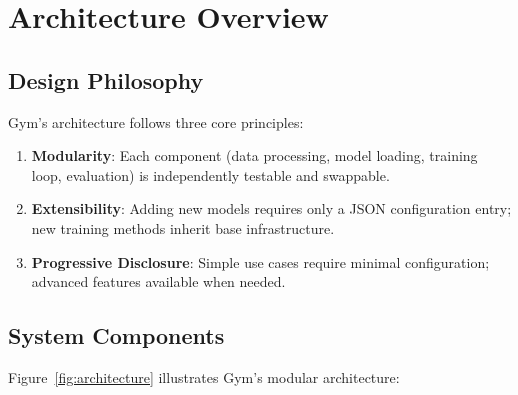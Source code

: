 \documentclass[11pt,letterpaper]{article}
\begin{document}
\section{Architecture Overview}

\subsection{Design Philosophy}

Gym's architecture follows three core principles:

\begin{enumerate}
\item \textbf{Modularity}: Each component (data processing, model loading, training loop, evaluation) is independently testable and swappable.
\item \textbf{Extensibility}: Adding new models requires only a JSON configuration entry; new training methods inherit base infrastructure.
\item \textbf{Progressive Disclosure}: Simple use cases require minimal configuration; advanced features available when needed.
\end{enumerate}

\subsection{System Components}

Figure~\ref{fig:architecture} illustrates Gym's modular architecture:
\end{document}
